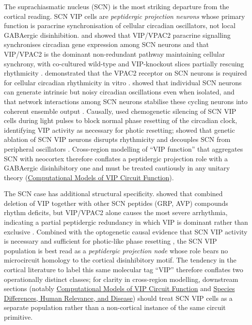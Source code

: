 \documentclass[11pt]{article}
\begin{document}
The suprachiasmatic nucleus (SCN) is the most striking departure from the cortical reading. SCN VIP cells are \textit{peptidergic projection neurons} whose primary function is paracrine synchronisation of cellular circadian oscillators, not local GABAergic disinhibition. \citet{Maywood2006} and \citet{Maywood2011} showed that VIP/VPAC2 paracrine signalling synchronises circadian gene expression among SCN neurons and that VIP/VPAC2 is the dominant non-redundant pathway maintaining cellular synchrony, with co-cultured wild-type and VIP-knockout slices partially rescuing rhythmicity \citep{Maywood2006, Maywood2011}. \citet{Cutler2003} demonstrated that the VPAC2 receptor on SCN neurons is required for cellular circadian rhythmicity in vitro \citep{Cutler2003}. \citet{Webb2009} showed that individual SCN neurons can generate intrinsic but noisy circadian oscillations even when isolated, and that network interactions among SCN neurons stabilise these cycling neurons into coherent ensemble output \citep{Webb2009}. Causally, \citet{Jones2018} used chemogenetic silencing of SCN VIP cells during light pulses to block normal phase resetting of the circadian clock, identifying VIP activity as necessary for photic resetting; \citet{Todd2020} showed that genetic ablation of SCN VIP neurons disrupts rhythmicity and decouples SCN from peripheral oscillators \citep{Jones2018, Todd2020, Maywood2006}. Cross-region modelling of ``VIP function'' that aggregates SCN with neocortex therefore conflates a peptidergic projection role with a GABAergic disinhibitory one and must be treated cautiously in any unitary theory (\href{/computational-models}{Computational Models of VIP Circuit Function}).

The SCN case has additional structural specificity. \citet{Maywood2011} showed that combined deletion of VIP together with other SCN peptides (GRP, AVP) compounds rhythm deficits, but VIP/VPAC2 alone causes the most severe arrhythmia, indicating a partial peptidergic redundancy in which VIP is dominant rather than exclusive \citep{Maywood2011, Maywood2006, Cutler2003}. Combined with the optogenetic causal evidence that SCN VIP activity is necessary and sufficient for photic-like phase resetting \citep{Jones2018, Todd2020}, the SCN VIP population is best read as a \textit{peptidergic projection node} whose role bears no microcircuit homology to the cortical disinhibitory motif. The tendency in the cortical literature to label this same molecular tag ``VIP'' therefore conflates two operationally distinct classes; for clarity in cross-region modelling, downstream sections (notably \href{/computational-models}{Computational Models of VIP Circuit Function} and \href{/disease-translational}{Species Differences, Human Relevance, and Disease}) should treat SCN VIP cells as a separate population rather than a non-cortical instance of the same circuit primitive.
\end{document}
